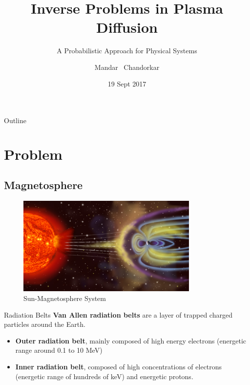 \documentclass{beamer}
\title{Inverse Problems in Plasma Diffusion}
\subtitle{A Probabilistic Approach for Physical Systems}
\author{Mandar ~Chandorkar}
\institute[CWI \& INRIA] %
{
  \inst{1}%
  Multiscale Dynamics\\
  CWI, Amsterdam
  \and
  \inst{2}%
  TAO Research Unit\\
  INRIA, CNRS, Saclay}
\date{19 Sept 2017}
\begin{document}
\begin{frame}
  \titlepage
\end{frame}

\begin{frame}{Outline}
  \tableofcontents
\end{frame}

\section{Problem}

\subsection{Magnetosphere}

\begin{frame}
  \begin{figure}[h]
        \includegraphics[width=0.8\textwidth]{Magnetosphere_rendition}
        \caption{Sun-Magnetosphere System}
        \label{fig:Solar}
      \end{figure}
\end{frame}

\begin{frame}{Radiation Belts}
  \textbf{Van Allen radiation belts} are a layer of trapped charged particles around the Earth.
  \begin{itemize}
  \item {
      \textbf{Outer radiation belt}, mainly composed of high energy electrons (energetic range around 0.1 to 10 MeV)
  }
  \item {
      \textbf{Inner radiation belt}, composed of high concentrations of electrons (energetic range of hundreds of keV) and energetic protons.
  }
  \end{itemize}
\end{frame}
\end{document}
